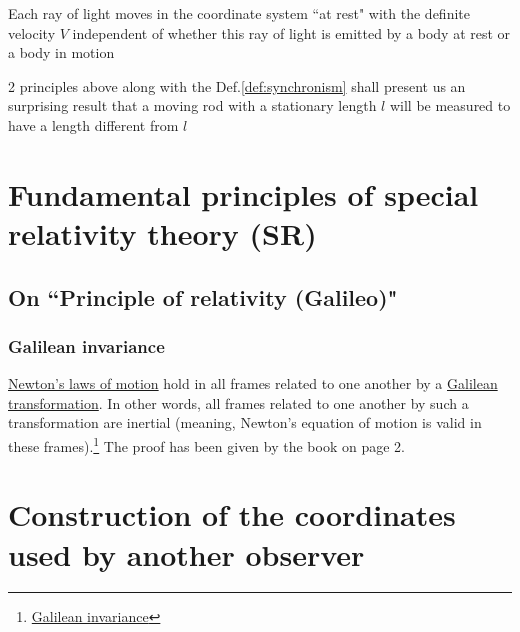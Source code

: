 \begin{tcolorbox}[
    enhanced,
    title=Principle of the Constancy of the Velocity of Light,
    colframe=green!50!black,
    colback=green!10!white,
    arc=0mm,
    colbacktitle=red!10!white,
    coltitle=green!50!black,
    attach boxed title to top text left={yshift=-0.50mm},
    boxed title style={
        skin=enhancedfirst jigsaw,
        size=small,arc=1mm,bottom=-1mm,
        interior style={fill=none, top color=green!30!white, bottom color=green!20!white}
    }
]
    Each ray of light moves in the coordinate system ``at rest" with the definite velocity $V$ independent of
    whether this ray of light is emitted by a body at rest or a body in motion
\end{tcolorbox}

2 principles above along with the Def.\ref{def:synchronism} shall present us an surprising result that a moving rod
with a stationary length $l$ will be measured to have a length different from $l$

\section{Fundamental principles of special relativity theory (SR)}

\subsection{On ``Principle of relativity (Galileo)"}

\subsubsection{Galilean invariance}

\href{https://en.wikipedia.org/wiki/Newton\%27s_laws_of_motion}{Newton's laws of motion} hold in all frames related
to one another by a \href{https://en.wikipedia.org/wiki/Galilean\_transformation}{Galilean transformation}. In
other words, all frames related to one another by such a transformation are inertial (meaning, Newton's equation of
motion is valid in these frames).\footnote{\href{https://en.wikipedia.org/wiki/Galilean_invariance}{Galilean invariance}}
The proof has been given by the book on page 2.

\section{Construction of the coordinates used by another observer}

